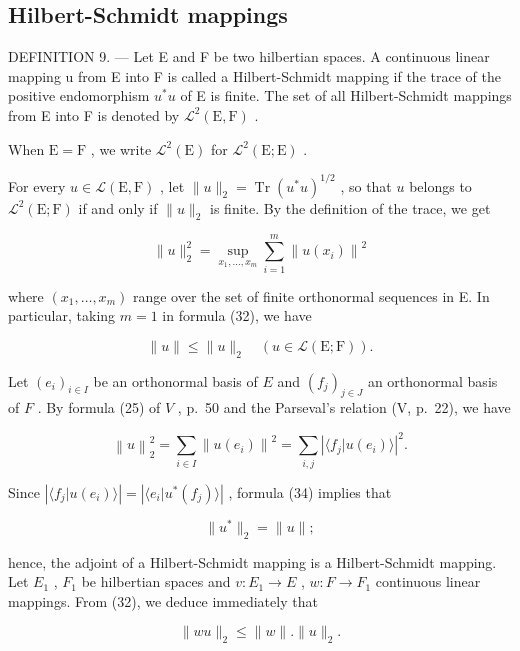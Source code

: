 \subsection{Hilbert-Schmidt mappings}

DEFINITION 9. --- Let E and F be two hilbertian spaces. A continuous linear mapping u from E into F is called a Hilbert-Schmidt mapping if the trace of the positive endomorphism \(u^{*}u\) of E is finite. The set of all Hilbert-Schmidt mappings from E into F is denoted by \(\mathcal{L}^{2}(\mathrm{E},\mathrm{F})\) .

When \(\mathrm{E} = \mathrm{F}\) , we write \(\mathcal{L}^2(\mathrm{E})\) for \(\mathcal{L}^2(\mathrm{E};\mathrm{E})\) .

For every \(u \in \mathcal{L}(\mathrm{E},\mathrm{F})\) , let \(\| u \|_2 = \operatorname{Tr}(u^* u)^{1/2}\) , so that \(u\) belongs to \(\mathcal{L}^2(\mathrm{E};\mathrm{F})\) if and only if \(\| u \|_2\) is finite. By the definition of the trace, we get

\[
\| u \| _ {2} ^ {2} = \sup _ {x _ {1}, \dots , x _ {m}} \sum_ {i = 1} ^ {m} \left\| u (x _ {i}) \right\| ^ {2}\tag{32}
\]

where \((x_{1},\ldots ,x_{m})\) range over the set of finite orthonormal sequences in E. In particular, taking \(m = 1\) in formula (32), we have

\[
\| u \| \leqslant \| u \| _ {2} \quad (u \in \mathscr {L} (\mathrm{E}; \mathrm{F})).\tag{33}
\]

Let \((e_i)_{i\in I}\) be an orthonormal basis of \(E\) and \((f_j)_{j\in J}\) an orthonormal basis of \(F\) . By formula (25) of \(V\) , p.~50 and the Parseval's relation (V, p.~22), we have

\[
\left\| u \right\| _ {2} ^ {2} = \sum_ {i \in I} \left\| u (e _ {i}) \right\| ^ {2} = \sum_ {i, j} \left| \langle f _ {j} | u (e _ {i}) \rangle \right| ^ {2}.\tag{34}
\]

Since \(\left|\langle f_j | u(e_i) \rangle\right| = \left|\langle e_i | u^*(f_j) \rangle\right|\) , formula (34) implies that

\[
\| u ^ {*} \| _ {2} = \| u \|;\tag{35}
\]

hence, the adjoint of a Hilbert-Schmidt mapping is a Hilbert-Schmidt mapping. Let \(E_{1}\) , \(F_{1}\) be hilbertian spaces and \(v: E_{1} \to E\) , \(w: F \to F_{1}\) continuous linear mappings. From (32), we deduce immediately that

\[
\| w u \| _ {2} \leqslant \| w \|. \| u \| _ {2}.\tag{36}
\]

